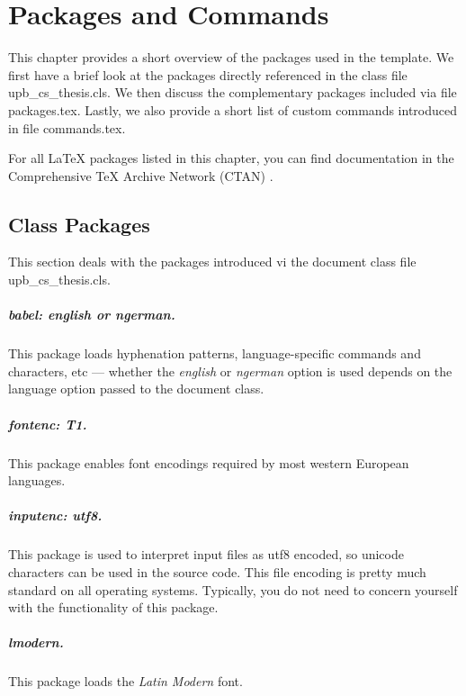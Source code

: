 \chapter{Packages and Commands}
\label{ch:packages}
This chapter provides a short overview of the packages used in the template.
We first have a brief look at the packages directly referenced in the class
file \mbox{upb\_cs\_thesis.cls}. 
We then discuss the complementary packages included via file
\mbox{packages.tex}.
Lastly, we also provide a short list of custom commands introduced in file
\mbox{commands.tex}.

For all \LaTeX{} packages listed in this chapter, you can find documentation in
the Comprehensive \TeX{} Archive Network (CTAN) \cite{CTAN}.



\section{Class Packages}
\label{sec:packages:class_packages}
This section deals with the packages introduced vi the document class file
\mbox{upb\_cs\_thesis.cls}.


\paragraph{babel: english or ngerman.}
This package loads hyphenation patterns, language-specific commands and
characters, etc --- whether the \emph{english} or \emph{ngerman} option is used
depends on the language option passed to the document class.


\paragraph{fontenc: T1.}
This package enables font encodings required by most western European
languages.


\paragraph{inputenc: utf8.}
This package is used to interpret input files as utf8 encoded, so unicode
characters can be used in the source code. 
This file encoding is pretty much standard on all operating systems.
Typically, you do not need to concern yourself with the functionality of this
package.


\paragraph{lmodern.}
This package loads the \emph{Latin Modern} font.


